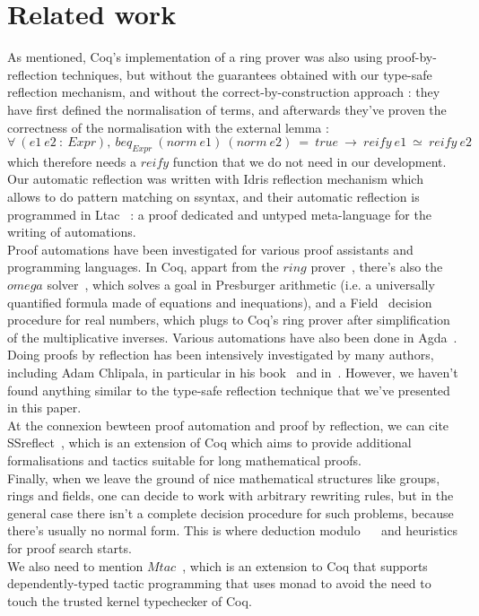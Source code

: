 \section{Related work}
\label{sect:relatedWork}

As mentioned, Coq's implementation of a ring prover was also using proof-by-reflection techniques, but without the guarantees obtained with our type-safe reflection mechanism, and without the correct-by-construction approach : they have first defined the normalisation of terms, and afterwards they've proven the correctness of the normalisation with the external lemma :
$\forall\ (e1\ e2\ :\ Expr),\ beq_{Expr}\ (norm\ e1)\ (norm\ e2)\ =\ true\ \rightarrow\ reify\ e1\ \simeq\ reify\ e2$ which therefore needs a $reify$ function that we do not need in our development.
Our automatic reflection was written with Idris reflection mechanism which allows to do pattern matching on ssyntax, and their automatic reflection is programmed in Ltac~\cite{DelahayeLTac} : a proof dedicated and untyped meta-language for the writing of automations. \\

Proof automations have been investigated for various proof assistants and programming languages. In Coq, appart from the $ring$ prover~\cite{Coq2005}, there's also the $omega$ solver~\cite{Cregut04}, which solves a goal in Presburger arithmetic (i.e. a universally quantified formula made of equations and inequations), and a Field~\cite{DelahayeField} decision procedure for real numbers, which plugs to Coq's ring prover after simplification of the multiplicative inverses. Various automations have also been done in Agda~\cite{Lindblad04}. \\

Doing proofs by reflection has been intensively investigated by many authors, including Adam Chlipala, in particular in his book~\cite{ChlipalaBook} and in~\cite{Malecha14}. However, we haven't found anything similar to the type-safe reflection technique that we've presented in this paper. \\

At the connexion bewteen proof automation and proof by reflection, we can cite SSreflect~\cite{GonthierTuto}, which is an extension of Coq which aims to provide additional formalisations and tactics suitable for long mathematical proofs. \\

Finally, when we leave the ground of nice mathematical structures like groups, rings and fields, one can decide to work with arbitrary rewriting rules, but in the general case there isn't a complete decision procedure for such problems, because there's usually no normal form. This is where deduction modulo~\cite{Dowek03} ~\cite{DelahayeModulo} and heuristics for proof search starts. \\

We also need to mention $Mtac$~\cite{Ziliani13}, which is an extension to Coq that supports dependently-typed tactic programming that uses monad to avoid the need to touch the trusted kernel typechecker of Coq.



